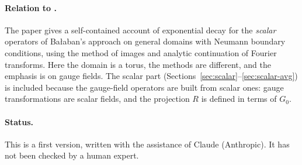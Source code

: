 \paragraph{Relation to \cite{DST1}.} The paper \cite{DST1} gives a self-contained account of exponential decay for the \emph{scalar} operators of Ba\l aban's approach on general domains with Neumann boundary conditions, using the method of images and analytic continuation of Fourier transforms. Here the domain is a torus, the methods are different, and the emphasis is on gauge fields. The scalar part (Sections~\ref{sec:scalar}--\ref{sec:scalar-avg}) is included because the gauge-field operators are built from scalar ones: gauge transformations are scalar fields, and the projection $R$ is defined in terms of $G_0$.

\paragraph{Status.} This is a first version, written with the assistance of Claude (Anthropic). It has not been checked by a human expert.

